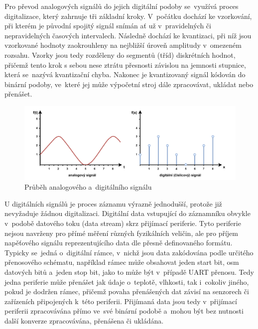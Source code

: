 Pro převod analogových signálů do jejich digitální podoby se~využívá proces digitalizace, který zahrnuje tři základní kroky. V~počátku dochází ke vzorkování, při kterém je původní spojitý signál snímán ať už v~pravidelných či nepravidelných časových intervalech. Následně dochází ke kvantizaci, při níž jsou vzorkované hodnoty zaokrouhleny na nejbližší úroveň amplitudy v~omezeném rozsahu. Vzorky jsou tedy rozděleny do segmentů (tříd) diskrétních hodnot, přičemž tento krok s sebou nese ztrátu přesnosti závislou na jemnosti stupnice, která se~nazývá kvantizační chyba. Nakonec je kvantizovaný signál kódován do binární podoby, ve~které jej může výpočetní stroj dále zpracovávat, ukládat nebo přenášet.~\cite{ieee_digital_sound_recorder_arm_sd_card, matousek_sitove_aplikace}

\begin{figure}[h]
    \centering
    \includegraphics[width=1.00\textwidth]{obrazky-figures/digital_vs_analog.pdf}
    \caption{Průběh analogového a~digitálního signálu}
    \label{fig:digital-vs-analog}
\end{figure}

\newpage

U digitálních signálů je proces záznamu výrazně jednodušší, protože již nevyžaduje žádnou digitalizaci. Digitální data vstupující do záznamníku obvykle v~podobě datového toku (data stream) skrz přijímací periferie. Tyto periferie nejsou navrženy pro přímé měření různých fyzikálních veličin, ale pro příjem napěťového signálu reprezentujícího data dle přesně definovaného formátu. Typicky se~jedná o~digitální rámce, v~nichž jsou data zakódována podle určitého přenosového schématu, například rámec může obsahovat jeden start bit, osm datových bitů a~jeden stop bit, jako to může být v~případě UART přenosu. Tedy jedna periferie může přenášet jak údaje o~teplotě, vlhkosti, tak i~cokoliv jiného, pokud je dodržen rámec, přičemž povaha přenášených dat závisí na senzorech či zařízeních připojených k~této periferii. Přijímaná data jsou tedy v~přijímací periferii zpracovávána přímo ve~své binární podobě a~mohou být bez nutnosti další konverze zpracovávána, přenášena či ukládána.~\cite{perny2008zarizeni_cas_znacky}

